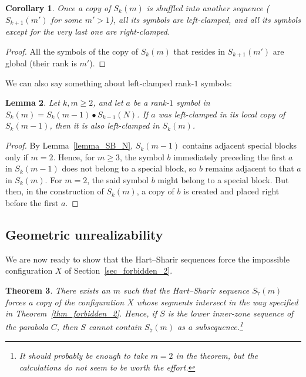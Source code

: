 \documentclass[11pt]{article}
\newtheorem{theorem}{Theorem}[section]
\newtheorem{lemma}[theorem]{Lemma}
\newtheorem{corollary}[theorem]{Corollary}
\theoremstyle{definition}
\theoremstyle{remark}
\begin{document}
\begin{corollary}\label{cor_global_clamped}
Once a copy of $S_k(m)$ is shuffled into another sequence ($S_{k+1}(m')$ for some $m'>1$), all its symbols are left-clamped, and all its symbols except for the very last one are right-clamped.
\end{corollary}

\begin{proof}
All the symbols of the copy of $S_k(m)$ that resides in $S_{k+1}(m')$ are global (their rank is $m'$).
\end{proof}

We can also say something about left-clamped rank-$1$ symbols:

\begin{lemma}\label{lem_rank1_leftclamped}
Let $k, m \ge 2$, and let $a$ be a rank-$1$ symbol in $S_k(m) = S_k(m-1)\bullet S_{k-1}(N)$. If $a$ was left-clamped in its local copy of $S_k(m-1)$, then it is also left-clamped in $S_k(m)$.
\end{lemma}

\begin{proof}
By Lemma~\ref{lemma_SB_N}, $S_k(m-1)$ contains adjacent special blocks only if $m=2$. Hence, for $m\ge 3$, the symbol $b$ immediately preceding the first $a$ in $S_k(m-1)$ does not belong to a special block, so $b$ remains adjacent to that $a$ in $S_k(m)$. For $m=2$, the said symbol $b$ might belong to a special block. But then, in the construction of $S_k(m)$, a copy of $b$ is created and placed right before the first $a$.
\end{proof}

\subsection{Geometric unrealizability}

We are now ready to show that the Hart--Sharir sequences force the impossible configuration $X$ of Section~\ref{sec_forbidden_2}.

\begin{theorem}\label{thm_HS_forces_X}
There exists an $m$ such that the Hart--Sharir sequence $S_7(m)$ forces a copy of the configuration $X$ whose segments intersect in the way specified in Theorem~\ref{thm_forbidden_2}. Hence, if $S$ is the lower inner-zone sequence of the parabola $C$, then $S$ cannot contain $S_7(m)$ as a subsequence.\footnote{It should probably be enough to take $m=2$ in the theorem, but the calculations do not seem to be worth the effort.}
\end{theorem}
\end{document}
